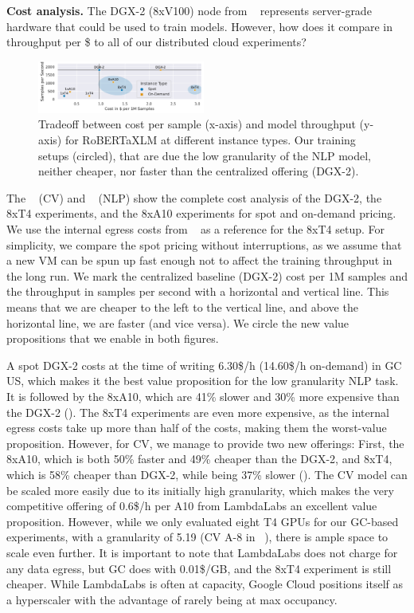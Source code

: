 \textbf{Cost analysis.} The DGX-2 (8xV100) node from ~ represents server-grade hardware that could be used to train models.
However, how does it compare in throughput per \$ to all of our distributed cloud experiments?
\begin{figure}
    \includegraphics[width=0.49\textwidth]{figures/misc/nlp_cost_per_sps_comparison}
    \vspace{-25pt}
    \caption{Tradeoff between cost per sample (x-axis) and model throughput (y-axis) for RoBERTaXLM at different instance types. Our training setups (circled), that are due the low granularity of the NLP model, neither cheaper, nor faster than the centralized offering (DGX-2).} 
    \label{fig:nlp-sps-trade-off}
    \vspace*{-4mm}
\end{figure}
The ~ (CV) and ~ (NLP) show the complete cost analysis of the DGX-2, the 8xT4 experiments, and the 8xA10 experiments for spot and on-demand pricing. We use the internal egress costs from ~ as a reference for the 8xT4 setup.
For simplicity, we compare the spot pricing without interruptions, as we assume that a new VM can be spun up fast enough not to affect the training throughput in the long run.
We mark the centralized baseline (DGX-2) cost per 1M samples and the throughput in samples per second with a horizontal and vertical line.
This means that we are cheaper to the left to the vertical line, and above the horizontal line, we are faster (and vice versa).
We circle the new value propositions that we enable in both figures.

A spot DGX-2 costs at the time of writing 6.30\$/h (14.60\$/h on-demand) in GC US, which makes it the best value proposition for the low granularity NLP task.
It is followed by the 8xA10, which are 41\% slower and 30\% more expensive than the DGX-2 (). 
The 8xT4 experiments are even more expensive, as the internal egress costs take up more than half of the costs, making them the worst-value proposition.
However, for CV, we manage to provide two new offerings: First, the 8xA10, which is both 50\% faster and 49\% cheaper than the DGX-2, and 8xT4, which is 58\% cheaper than DGX-2, while being 37\% slower ().
The CV model can be scaled more easily due to its initially high granularity, which makes the very competitive offering of 0.6\$/h per A10 from LambdaLabs an excellent value proposition.
However, while we only evaluated eight T4 GPUs for our GC-based experiments, with a granularity of 5.19 (CV A-8 in ~), there is ample space to scale even further.
It is important to note that LambdaLabs does not charge for any data egress, but GC does with 0.01\$/GB, and the 8xT4 experiment is still cheaper.  
While LambdaLabs is often at capacity, Google Cloud positions itself as a hyperscaler with the advantage of rarely being at max occupancy. 

